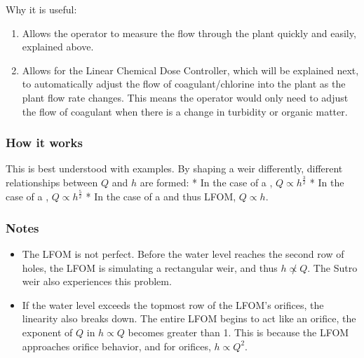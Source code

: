 \documentclass[letterpaper,10pt,english]{sphinxmanual}
\begin{document}
Why it is useful:
\begin{enumerate}
\item {} 
Allows the operator to measure the flow through the plant quickly and easily, explained above.

\item {} 
Allows for the Linear Chemical Dose Controller, which will be explained next, to automatically adjust the flow of coagulant/chlorine into the plant as the plant flow rate changes. This means the operator would only need to adjust the flow of coagulant when there is a change in turbidity or organic matter.

\end{enumerate}


\subsubsection{How it works}
\label{\detokenize{Flow_Control_and_Measurement/FCM_Design:id7}}
This is best understood with examples. By shaping a weir differently, different relationships between \(Q\) and \(h\) are formed:
* In the case of a , \(Q \propto h^{\frac{3}{2}}\)
* In the case of a , \(Q \propto h^{\frac{5}{2}}\)
* In the case of a  and thus LFOM, \(Q \propto h\).


\subsubsection{Notes}
\label{\detokenize{Flow_Control_and_Measurement/FCM_Design:id8}}\begin{itemize}
\item {} 
The LFOM is not perfect. Before the water level reaches the second row of holes, the LFOM is simulating a rectangular weir, and thus \(h \not\propto Q\). The Sutro weir also experiences this problem.

\item {} 
If the water level exceeds the topmost row of the LFOM’s orifices, the linearity also breaks down. The entire LFOM begins to act like an orifice, the exponent of \(Q\) in \(h \propto Q\) becomes greater than 1. This is because the LFOM approaches orifice behavior, and for orifices, \(h \propto Q^2\).

\end{itemize}
\end{document}
